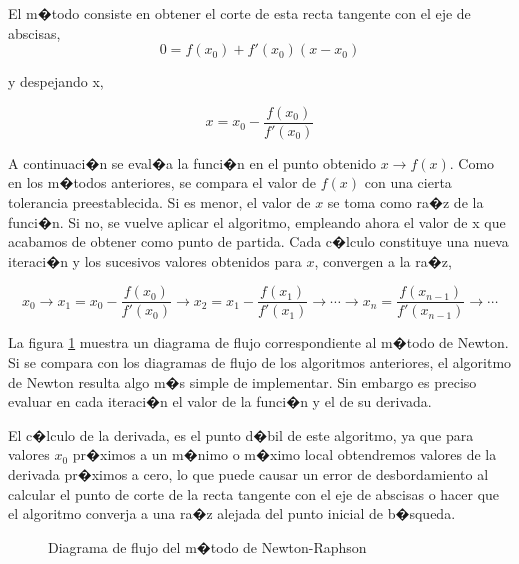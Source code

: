 El m�todo consiste en obtener el corte de esta recta tangente con el eje de abscisas,
\begin{equation*}
0= f(x_0)+f'(x_0)(x-x_0)
\end{equation*}

y despejando x,

\begin{equation*}
x=x_0-\frac{f(x_0)}{f'(x_0)}
\end{equation*}

A continuaci�n se eval�a la funci�n en el punto obtenido $x\rightarrow f(x)$. Como en los m�todos anteriores, se compara el valor de $f(x)$ con una cierta tolerancia preestablecida. Si es menor, el valor de $x$ se toma como ra�z de la funci�n. Si no, se vuelve aplicar el algoritmo, empleando ahora el valor de x que acabamos de obtener como punto de partida. Cada c�lculo constituye una nueva iteraci�n y los sucesivos valores obtenidos para $x$, convergen a la ra�z,

\begin{equation*}
x_0\rightarrow x_1=x_0-\frac{f(x_0)}{f'(x_0)}\rightarrow x_2=x_1-\frac{f(x_1)}{f'(x_1)}\rightarrow  \cdots \rightarrow x_n=\frac{f(x_{n-1})}{f'(x_{n-1})}\rightarrow \cdots
\end{equation*}

La figura \ref{fig:newton} muestra un diagrama de flujo correspondiente al m�todo de Newton. Si se compara con los diagramas de flujo de los algoritmos anteriores, el algoritmo de Newton resulta algo m�s simple de implementar. Sin embargo es preciso evaluar en cada iteraci�n el valor de la funci�n y el de su derivada. 

El c�lculo de la derivada, es el punto d�bil de este algoritmo, ya que para valores $x_0$ pr�ximos a un m�nimo o m�ximo local obtendremos valores de la derivada pr�ximos a cero, lo que puede causar un error de desbordamiento al calcular el punto de corte de la recta tangente con el eje de abscisas o hacer que el algoritmo converja a una ra�z alejada del punto inicial de b�squeda.
 
\begin{figure}[h]
\centering
{}
\caption{Diagrama de flujo del m�todo de Newton-Raphson}
\label{fig:newton}
\end{figure}

